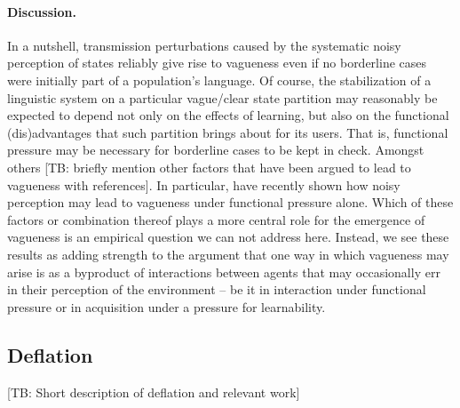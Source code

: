 \documentclass[10pt,a4paper]{article}
\newcommand{\tb}[1]{\textcolor[rgb]{.8,.33,.0}{[TB: #1]}}%
\begin{document}
\paragraph{Discussion.}
In a nutshell, transmission perturbations caused by the systematic noisy perception of states reliably give rise to vagueness even if no borderline cases were initially part of a population's language. Of course, the stabilization of a linguistic system on a particular vague/clear state partition may reasonably be expected to depend not only on the effects of learning, but also on the functional (dis)advantages that such partition brings about for its users. That is, functional pressure may be necessary for borderline cases to be kept in check. Amongst others \tb{briefly mention other factors that have been argued to lead to vagueness with references}. In particular, \citet{franke+correia:toappear} have recently shown how noisy perception may lead to vagueness under functional pressure alone. Which of these factors or combination thereof plays a more central role for the emergence of vagueness is an empirical question we can not address here. Instead, we see these results as adding strength to the argument that one way in which vagueness may arise is as a byproduct of interactions between agents that may occasionally err in their perception of the environment -- be it in interaction under functional pressure or in acquisition under a pressure for learnability. 


\subsection{Deflation}

\tb{Short description of deflation and relevant work}
\end{document}

